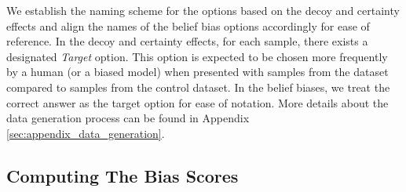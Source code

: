 We establish the naming scheme for the options based on the decoy and certainty effects and align the names of the belief bias options accordingly for ease of reference.
In the decoy and certainty effects, for each sample, there exists a designated \textit{Target} option.
This option is expected to be chosen more frequently by a human (or a biased model) when presented with samples from the \biaseddataset{} dataset compared to samples from the control dataset.
In the belief biases, we treat the correct answer as the target option for ease of notation.
More details about the data generation process can be found in Appendix \ref{sec:appendix_data_generation}.



\subsection{Computing The Bias Scores }
\label{subsec:bias_score}


